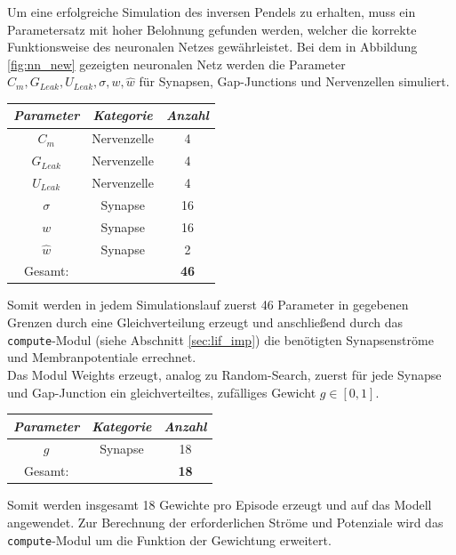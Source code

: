 	Um eine erfolgreiche Simulation des inversen Pendels zu erhalten, muss ein Parametersatz mit hoher Belohnung gefunden werden, welcher die korrekte Funktionsweise des neuronalen Netzes gewährleistet. Bei dem in Abbildung \ref{fig:nn_new} gezeigten neuronalen Netz werden die Parameter $C_m, G_{Leak}, U_{Leak}, \sigma, w, \hat{w}$ für Synapsen, Gap-Junctions und Nervenzellen simuliert.
	\begin{center}
		\begin{tabular}{c@{\hskip 0.5cm}c@{\hskip 0.5cm}c@{\hskip 0.5cm}}    \toprule
			\setlength{\tabcolsep}{50pt}
			\renewcommand{\arraystretch}{1.5}
			\emph{Parameter}	& \emph{Kategorie}  & \emph{Anzahl} \\\midrule
			$C_m$				& Nervenzelle		& 4				\\ 
			$G_{Leak}$	 		& Nervenzelle		& 4				\\
			$U_{Leak}$	 		& Nervenzelle		& 4				\\
			$\sigma$			& Synapse			& 16			\\
			$w$					& Synapse			& 16			\\ 
			$\hat{w}$			& Synapse			& 2				\\\bottomrule
			Gesamt:				&					& \textbf{46}	\\
			\hline
		\end{tabular}
	\end{center}
	Somit werden in jedem Simulationslauf zuerst 46 Parameter in gegebenen Grenzen durch eine Gleichverteilung erzeugt und anschließend durch das \texttt{compute}-Modul (siehe Abschnitt \ref{sec:lif_imp}) die benötigten Synapsenströme und Membranpotentiale errechnet.\\
	Das Modul Weights erzeugt, analog zu Random-Search, zuerst für jede Synapse und Gap-Junction ein gleichverteiltes, zufälliges Gewicht $g\in[0,1]$.
	\begin{center}
		\begin{tabular}{c@{\hskip 0.5cm}c@{\hskip 0.5cm}c@{\hskip 0.5cm}}    \toprule
			\setlength{\tabcolsep}{50pt}
			\renewcommand{\arraystretch}{1.5}
			\emph{Parameter}	& \emph{Kategorie}  & \emph{Anzahl} \\\midrule
			$g$					& Synapse			& 18			\\\bottomrule
			Gesamt:				&					& \textbf{18}	\\
			\hline
		\end{tabular}
	\end{center}
	Somit werden insgesamt 18 Gewichte pro Episode erzeugt und auf das Modell angewendet. Zur Berechnung der erforderlichen Ströme und Potenziale wird das \texttt{compute}-Modul um die Funktion der Gewichtung erweitert.
	
